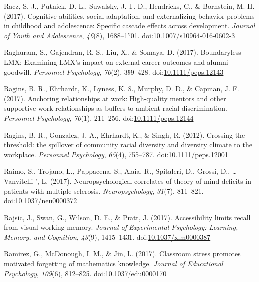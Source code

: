 \documentclass[english,man]{apa6}
\theoremstyle{definition}
\theoremstyle{definition}
\theoremstyle{definition}
\theoremstyle{remark}
\begin{document}
\hypertarget{ref-Racz2017}{}
Racz, S. J., Putnick, D. L., Suwalsky, J. T. D., Hendricks, C., \&
Bornstein, M. H. (2017). Cognitive abilities, social adaptation, and
externalizing behavior problems in childhood and adolescence: Specific
cascade effects across development. \emph{Journal of Youth and
Adolescence}, \emph{46}(8), 1688--1701.
doi:\href{https://doi.org/10.1007/s10964-016-0602-3}{10.1007/s10964-016-0602-3}

\hypertarget{ref-Raghuram2017}{}
Raghuram, S., Gajendran, R. S., Liu, X., \& Somaya, D. (2017).
Boundaryless LMX: Examining LMX's impact on external career outcomes and
alumni goodwill. \emph{Personnel Psychology}, \emph{70}(2), 399--428.
doi:\href{https://doi.org/10.1111/peps.12143}{10.1111/peps.12143}

\hypertarget{ref-Ragins2017}{}
Ragins, B. R., Ehrhardt, K., Lyness, K. S., Murphy, D. D., \& Capman, J.
F. (2017). Anchoring relationships at work: High-quality mentors and
other supportive work relationships as buffers to ambient racial
discrimination. \emph{Personnel Psychology}, \emph{70}(1), 211--256.
doi:\href{https://doi.org/10.1111/peps.12144}{10.1111/peps.12144}

\hypertarget{ref-Ragins2012}{}
Ragins, B. R., Gonzalez, J. A., Ehrhardt, K., \& Singh, R. (2012).
Crossing the threshold: the spillover of community racial diversity and
diversity climate to the workplace. \emph{Personnel Psychology},
\emph{65}(4), 755--787.
doi:\href{https://doi.org/10.1111/peps.12001}{10.1111/peps.12001}

\hypertarget{ref-Raimo2017}{}
Raimo, S., Trojano, L., Pappacena, S., Alaia, R., Spitaleri, D., Grossi,
D., \ldots{} Vanvitelli ', L. (2017). Neuropsychological correlates of
theory of mind deficits in patients with multiple sclerosis.
\emph{Neuropsychology}, \emph{31}(7), 811--821.
doi:\href{https://doi.org/10.1037/neu0000372}{10.1037/neu0000372}

\hypertarget{ref-Rajsic2017}{}
Rajsic, J., Swan, G., Wilson, D. E., \& Pratt, J. (2017). Accessibility
limits recall from visual working memory. \emph{Journal of Experimental
Psychology: Learning, Memory, and Cognition}, \emph{43}(9), 1415--1431.
doi:\href{https://doi.org/10.1037/xlm0000387}{10.1037/xlm0000387}

\hypertarget{ref-Ramirez2017}{}
Ramirez, G., McDonough, I. M., \& Jin, L. (2017). Classroom stress
promotes motivated forgetting of mathematics knowledge. \emph{Journal of
Educational Psychology}, \emph{109}(6), 812--825.
doi:\href{https://doi.org/10.1037/edu0000170}{10.1037/edu0000170}
\end{document}
